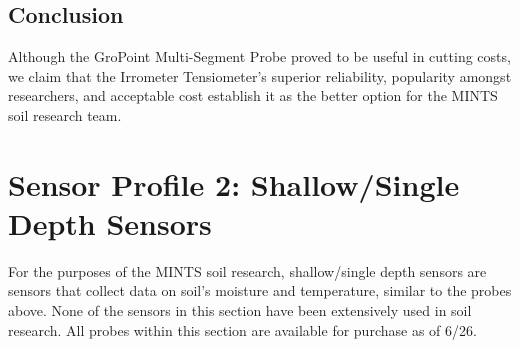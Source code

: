\documentclass{article}
\begin{document}
\subsection{Conclusion}
Although the GroPoint Multi-Segment Probe proved to be useful in cutting costs, we claim that the Irrometer Tensiometer's superior reliability, popularity amongst researchers, and acceptable cost establish it as the better option for the MINTS soil research team.


\section{Sensor Profile 2: Shallow/Single Depth Sensors}
For the purposes of the MINTS soil research, shallow/single depth sensors are sensors that collect data on soil's moisture and temperature, similar to the probes above. None of the sensors in this section have been extensively used in soil research. All probes within this section are available for purchase as of 6/26.
\end{document}
